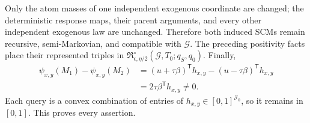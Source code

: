 Only the atom masses of one independent exogenous coordinate are changed; the deterministic response maps, their parent arguments, and every other independent exogenous law are unchanged.  Therefore both induced SCMs remain recursive, semi-Markovian, and compatible with \(\mathcal G\).  The preceding positivity facts place their represented triples in \(\mathfrak R_{\epsilon,\eta/2}^{\circ}(\mathcal G,T_0;q_S,q_0)\).  Finally,
\[
 \begin{aligned}
 \psi_{x,y}(M_1)-\psi_{x,y}(M_2)
 &=(u+\tau\beta)^{\mathsf T}h_{x,y}
 -(u-\tau\beta)^{\mathsf T}h_{x,y}\\
 &=2\tau\beta^{\mathsf T}h_{x,y}\neq0.
 \end{aligned}
\]
Each query is a convex combination of entries of \(h_{x,y}\in[0,1]^{\mathcal J_0}\), so it remains in \([0,1]\).  This proves every assertion.